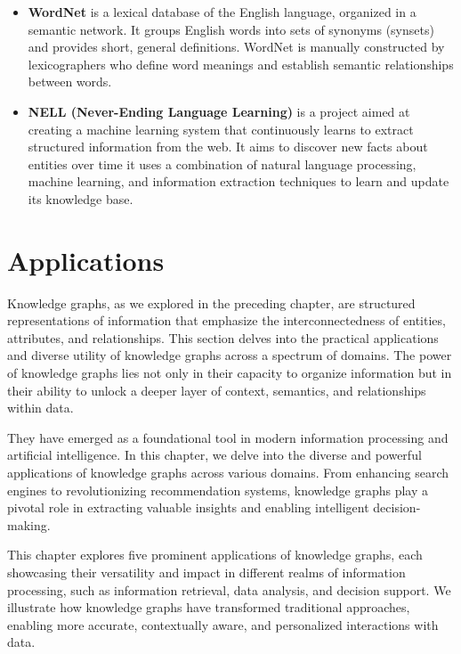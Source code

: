 \begin{itemize}
    \item \textbf{WordNet} is a lexical database of the English language, organized in a semantic network. It groups English words into sets of synonyms (synsets) and provides short, general definitions. WordNet is manually constructed by lexicographers who define word meanings and establish semantic relationships between words.
    
    \item \textbf{NELL (Never-Ending Language Learning)} is a project aimed at creating a machine learning system that continuously learns to extract structured information from the web. It aims to discover new facts about entities over time it uses a combination of natural language processing, machine learning, and information extraction techniques to learn and update its knowledge base.
\end{itemize}

\section{Applications}\label{sec:kgs-applications}

Knowledge graphs, as we explored in the preceding chapter, are structured representations of information that emphasize the interconnectedness of entities, attributes, and relationships. This section delves into the practical applications and diverse utility of knowledge graphs across a spectrum of domains. The power of knowledge graphs lies not only in their capacity to organize information but in their ability to unlock a deeper layer of context, semantics, and relationships within data. 

They have emerged as a foundational tool in modern information processing and artificial intelligence. In this chapter, we delve into the diverse and powerful applications of knowledge graphs across various domains. From enhancing search engines to revolutionizing recommendation systems, knowledge graphs play a pivotal role in extracting valuable insights and enabling intelligent decision-making.

This chapter explores five prominent applications of knowledge graphs, each showcasing their versatility and impact in different realms of information processing, such as information retrieval, data analysis, and decision support. We illustrate how knowledge graphs have transformed traditional approaches, enabling more accurate, contextually aware, and personalized interactions with data.

